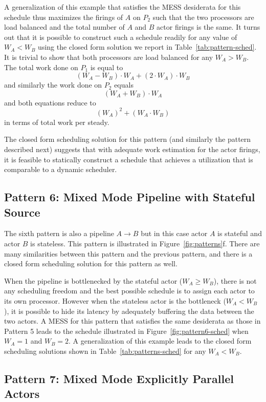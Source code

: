 A generalization of this example that satisfies the MESS desiderata
for this schedule thus maximizes the firings of $A$ on $P_2$ such that
the two processors are load balanced and the total number of $A$ and
$B$ actor firings is the same. It turns out that it is possible to
construct such a schedule readily for any value of $W_A < W_B$ using
the closed form solution we report in
Table~\ref{tab:pattern-sched}. It is trivial to show that both
processors are load balanced for any $W_A > W_B$. The total work done
on $P_1$ is equal to
\[
(W_A - W_B) \cdot W_A + (2 \cdot W_A) \cdot W_B
\]
and similarly the work done on $P_2$ equals
\[
(W_A + W_B) \cdot W_A
\]
and both equations reduce to 
\[
(W_A)^2 + (W_A \cdot W_B)
\]
in terms of total work per steady.

The closed form scheduling solution for this pattern (and similarly
the pattern described next) suggests that with adequate work
estimation for the actor firings, it is feasible to statically
construct a schedule that achieves a utilization that is comparable to
a dynamic scheduler.

\subsection{Pattern 6: Mixed Mode Pipeline with Stateful Source}

The sixth pattern is also a pipeline $A\rightarrow B$ but in this case
actor $A$ is stateful and actor $B$ is stateless. This pattern is
illustrated in Figure~\ref{fig:patterns}f. There are many similarities
between this pattern and the previous pattern, and there is a closed
form scheduling solution for this pattern as well. 

When the pipeline is bottlenecked by the stateful actor ($W_A \ge
W_B$), there is not any scheduling freedom and the best possible
schedule is to assign each actor to its own processor. However when
the stateless actor is the bottleneck ($W_A < W_B$), it is possible to
hide its latency by adequately buffering the data between the two
actors. A MESS for this pattern that satisfies the same desiderata as
those in Pattern 5 leads to the schedule illustrated in
Figure~\ref{fig:pattern6-sched} when $W_A = 1$ and $W_B = 2$.  A
generalization of this example leads to the closed form scheduling
solutions shown in Table~\ref{tab:patterns-sched} for any $W_A < W_B$.


\subsection{Pattern 7: Mixed Mode Explicitly Parallel Actors}


